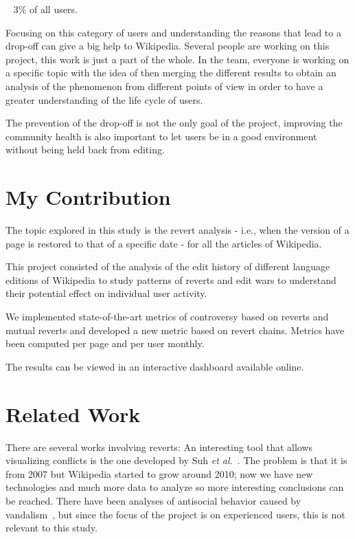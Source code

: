~ 3\% of all users. 

Focusing on this category of users and understanding the reasons that lead to a drop-off can give a
big help to Wikipedia. Several people are working on this project, this work is just a part of the whole.
In the team, everyone is working on a specific topic with the idea of then merging the different
results to obtain an analysis of the phenomenon from different points of view in order to have a
greater understanding of the life cycle of users.  

The prevention of the drop-off is not the only goal of the project, improving the community health
is also important to let users be in a good environment without being held back from editing. 

\section{My Contribution}
\label{sec:project}
The topic explored in this study is the revert analysis - i.e., when the version of a page is
restored to that of a specific date - for all the articles of Wikipedia.

This project consisted of the analysis of the edit history of different language editions of
Wikipedia to study patterns of reverts and edit wars to understand their potential effect on
individual user activity.

We implemented state-of-the-art metrics of controversy based on reverts and mutual reverts and
developed a new metric based on revert chains. Metrics have been computed per page and per user
monthly.

The results can be viewed in an interactive dashboard available online.

\section{Related Work}
There are several works involving reverts: An interesting tool that allows visualizing conflicts is
the one developed by Suh  \textit{et al.}~\cite{Suh2007}. The problem is that it is from 2007 but Wikipedia started to grow around
2010; now we have new technologies and much more data to analyze so more interesting conclusions can
be reached. There have been analyses of antisocial behavior caused by vandalism~\cite{Kiesel2017}, but since the focus
of the project is on experienced users, this is not relevant to this study. 